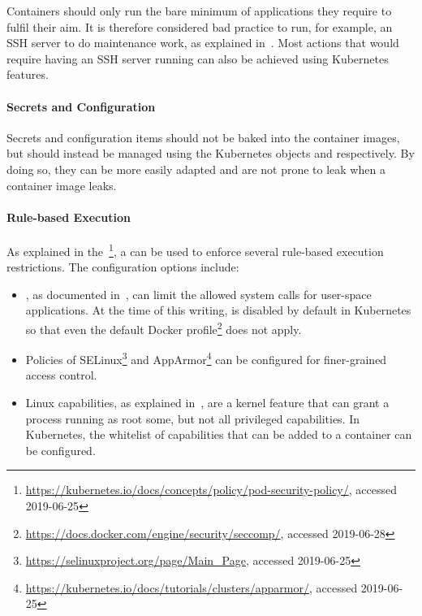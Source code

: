 Containers should only run the bare minimum of applications they require to fulfil their aim. It is therefore considered bad practice to run, for example, an SSH server to do maintenance work, as explained in~\textcite{noSSHDinContainers}. Most actions that would require having an SSH server running can also be achieved using Kubernetes features.

\paragraph{Secrets and Configuration}

Secrets and configuration items should not be baked into the container images, but should instead be managed using the Kubernetes objects  and  respectively. By doing so, they can be more easily adapted and are not prone to leak when a container image leaks.

\paragraph{Rule-based Execution}

As explained in the~\textcite{k8sdocs}\footnote{\url{https://kubernetes.io/docs/concepts/policy/pod-security-policy/}, accessed 2019-06-25}, a  can be used to enforce several rule-based execution restrictions. The configuration options include:

\begin{itemize}
    \item {}, as documented in~\textcite{seccompMan}, can limit the allowed system calls for user-space applications. At the time of this writing,  is disabled by default in Kubernetes so that even the default Docker profile\footnote{\url{https://docs.docker.com/engine/security/seccomp/}, accessed 2019-06-28} does not apply.
    \item Policies of SELinux\footnote{\url{https://selinuxproject.org/page/Main_Page}, accessed 2019-06-25} and AppArmor\footnote{\url{https://kubernetes.io/docs/tutorials/clusters/apparmor/}, accessed 2019-06-25} can be configured for finer-grained access control. 
    \item Linux capabilities, as explained in~\textcite{linuxCaps}, are a kernel feature that can grant a process running as root some, but not all privileged capabilities. In Kubernetes, the whitelist of capabilities that can be added to a container can be configured.
\end{itemize}

